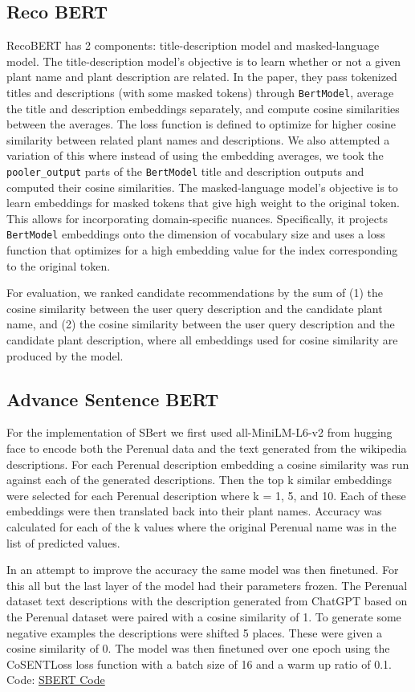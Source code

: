 \documentclass[11pt]{article}
\begin{document}
\subsection{Reco BERT}
RecoBERT has 2 components: title-description model and masked-language model. The
title-description model's objective is to learn whether or not a given plant name
and plant description are related. In the paper, they pass tokenized titles and
descriptions (with some masked tokens) through \texttt{BertModel}, average the title
and description embeddings separately, and compute cosine similarities between the
averages. The loss function is defined to optimize for higher cosine similarity
between related plant names and descriptions. We also attempted a variation of this
where instead of using the embedding averages, we took the \texttt{pooler\_output} parts of
the \texttt{BertModel} title and description outputs and computed their cosine similarities.
The masked-language model's objective is to learn embeddings for masked tokens that
give high weight to the original token. This allows for incorporating domain-specific
nuances. Specifically, it projects \texttt{BertModel} embeddings onto the dimension of vocabulary
size and uses a loss function that optimizes for a high embedding value for the index
corresponding to the original token.

For evaluation, we ranked candidate recommendations by the sum of (1) the cosine similarity between the user query description and the candidate plant name, and (2) the cosine similarity between the user query description and the candidate plant description, where all embeddings used for cosine similarity are produced by the model.


\subsection{Advance Sentence BERT}
For the implementation of SBert we first used all-MiniLM-L6-v2 from hugging face   to encode both the Perenual data and the text generated from the wikipedia descriptions. For each Perenual description embedding a cosine similarity was run against each of the generated descriptions. Then the top k similar embeddings were selected for each Perenual description where k = 1, 5, and 10. Each of these embeddings were then translated back into their plant names. Accuracy was calculated for each of the k values where the original Perenual name was in the list of predicted values.

In an attempt to improve the accuracy the same model was then finetuned. For this all but the last layer of the model had their parameters frozen. The Perenual dataset text descriptions with the description generated from ChatGPT based on the Perenual dataset were paired with a cosine similarity of 1. To generate some negative examples the descriptions were shifted 5 places. These were given a cosine similarity of 0. The model was then finetuned over one epoch using the CoSENTLoss loss function \cite{huggingface2023sberttraining} with a batch size of 16 and a warm up ratio of 0.1.
Code: \href{https://github.com/NajmeRah/DATASCI266_FinalProject/blob/main/Code/SBert.ipynb}{SBERT Code}
\end{document}
